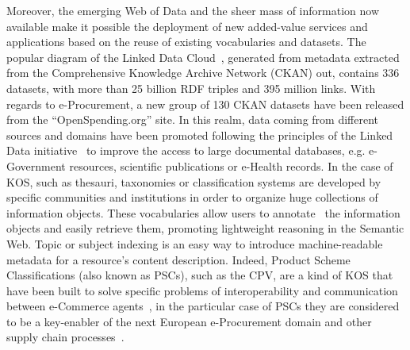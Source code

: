 Moreover, the emerging Web of Data and the sheer mass of information now available make it possible the deployment of new 
added-value services and applications based on the reuse of existing vocabularies and datasets. 
The popular diagram of the Linked Data Cloud~\cite{linked-data-cloud}, generated from metadata extracted from the 
Comprehensive Knowledge Archive Network (CKAN) out, contains $336$ datasets, with more than 25 billion RDF triples and 395 million links. 
With regards to e-Procurement, a new group of 130 CKAN datasets have been released from the ``OpenSpending.org'' site. In this realm, 
data coming from different sources and domains have been promoted following the principles of the 
Linked Data initiative~\cite{Berners-Lee-2006} to improve the access to large documental databases, 
e.g. e-Government resources, scientific publications or e-Health records. In the case of KOS, such as thesauri, taxonomies or classification systems 
are developed by specific communities and institutions in order to organize huge collections of information objects. 
These vocabularies allow users to annotate~\cite{Leukel-standard,Leukel-automating,Leukel-comparative} the information objects and easily retrieve them, 
promoting lightweight reasoning in the Semantic Web. Topic or subject indexing is an easy way to introduce machine-readable metadata for a resource's content 
description. Indeed, Product Scheme Classifications (also known as PSCs), such as the CPV, are a kind of KOS that have been built to solve specific problems 
of interoperability and communication between e-Commerce agents~\cite{FenselOmel2001,Leukel-findings}, in the particular case of PSCs they are considered to be a key-enabler of 
the next European e-Procurement domain and other supply chain processes~\cite{DBLP:journals/tcci/Alor-HernandezAJPRMBG10}.


